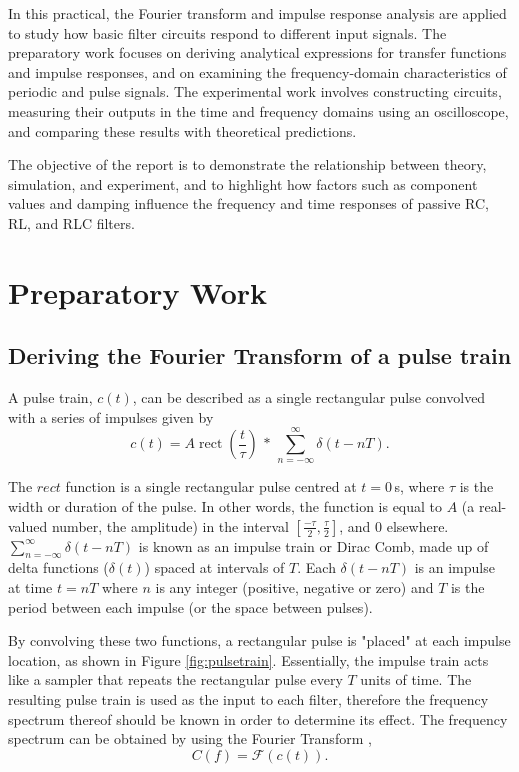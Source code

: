\documentclass[a4paper, onecolumn, 12pt]{IEEEtran}
\begin{document}
In this practical, the Fourier transform and impulse response analysis are applied to study how basic filter circuits respond to different input signals. The preparatory work focuses on deriving analytical expressions for transfer functions and impulse responses, and on examining the frequency-domain characteristics of periodic and pulse signals. The experimental work involves constructing circuits, measuring their outputs in the time and frequency domains using an oscilloscope, and comparing these results with theoretical predictions.

The objective of the report is to demonstrate the relationship between theory, simulation, and experiment, and to highlight how factors such as component values and damping influence the frequency and time responses of passive RC, RL, and RLC filters.


\newpage
\section{Preparatory Work}
\label{sec:prep_work}

\subsection{Deriving the Fourier Transform of a pulse train}
\label{subsec:cf}

A pulse train, $c(t)$, can be described as a single rectangular pulse convolved with a series of impulses given by \cite{lathi}
\begin{equation} \label{c(t)}
  c(t) = A\operatorname{rect}(\frac{t}{\tau}) \,\ast\, \sum_{n=-\infty}^{\infty} \delta(t-nT).
\end{equation}

The $rect$ function is a single rectangular pulse centred at $t=0\,$s, where $\tau$ is the width or duration of the pulse. In other words, the function is equal to $A$ (a real-valued number, the amplitude) in the interval $[\frac{-\tau}{2}, \frac{\tau}{2}]$, and 0 elsewhere. $\sum_{n=-\infty}^{\infty} \delta(t-nT)$ is known as an impulse train or Dirac Comb, made up of delta functions ($\delta(t)$) spaced at intervals of $T$. Each $\delta(t-nT)$ is an impulse at time $t=nT$ where $n$ is any integer (positive, negative or zero) and $T$ is the period between each impulse (or the space between pulses). \cite{lathi}

By convolving these two functions, a rectangular pulse is "placed" at each impulse location, as shown in Figure \ref{fig:pulsetrain}. Essentially, the impulse train acts like a sampler that repeats the rectangular pulse every $T$ units of time. The resulting pulse train is used as the input to each filter, therefore the frequency spectrum thereof should be known in order to determine its effect. The frequency spectrum can be obtained by using the Fourier Transform \cite{lathi},
\begin{equation}\label{fouriertransform}
  C(f) = \mathscr{F}(c(t)).
\end{equation}
\end{document}
